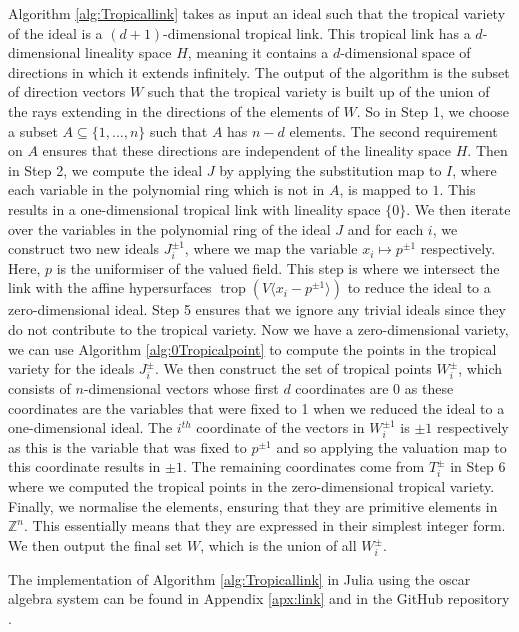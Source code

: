 \documentclass[11pt,reqno,a4paper]{article}
\theoremstyle{theoremstyle}
\theoremstyle{examplestyle}
\theoremstyle{algorithmstyle}
\numberwithin{equation}{subsection}
\newcommand{\ZZ}{\mathbb{Z}}
\DeclareMathOperator{\trop}{trop}
\begin{document}
Algorithm \ref{alg:Tropicallink} takes as input an ideal such that the tropical variety of the ideal is a $(d+1)$-dimensional tropical link. This tropical link has a $d$-dimensional lineality space $H$, meaning it contains a $d$-dimensional space of directions in which it extends infinitely. The output of the algorithm is the subset of direction vectors $W$ such that the tropical variety is built up of the union of the rays extending in the directions of the elements of $W$. So in Step 1, we choose a subset $A \subseteq \{1,\ldots,n\}$ such that $A$ has $n-d$ elements. The second requirement on $A$ ensures that these directions are independent of the lineality space $H$. Then in Step 2, we compute the ideal $J$ by applying the substitution map to $I$, where each variable in the polynomial ring which is not in $A$, is mapped to $1$. This results in a one-dimensional tropical link with lineality space $\{0\}$. We then iterate over the variables in the polynomial ring of the ideal $J$ and for each $i$, we construct two new ideals $J_i^{\pm1}$, where we map the variable $x_i \mapsto p^{\pm1}$ respectively. Here, $p$ is the uniformiser of the valued field. This step is where we intersect the link with the affine hypersurfaces $\trop\left(V\langle x_i - p^{\pm1}\rangle \right)$ to reduce the ideal to a zero-dimensional ideal. Step 5 ensures that we ignore any trivial ideals since they do not contribute to the tropical variety. Now we have a zero-dimensional variety, we can use Algorithm \ref{alg:0Tropicalpoint} to compute the points in the tropical variety for the ideals $J_i^\pm$. We then construct the set of tropical points $W_i^\pm$, which consists of $n$-dimensional vectors whose first $d$ coordinates are $0$ as these coordinates are the variables that were fixed to 1 when we reduced the ideal to a one-dimensional ideal. The $i^{th}$ coordinate of the vectors in $W_i^{\pm1}$ is $\pm1$ respectively as this is the variable that was fixed to $p^{\pm1}$ and so applying the valuation map to this coordinate results in $\pm1$. The remaining coordinates come from $T_i^\pm$ in Step 6 where we computed the tropical points in the zero-dimensional tropical variety. Finally, we normalise the elements, ensuring that they are primitive elements in $\ZZ^n$. This essentially means that they are expressed in their simplest integer form. We then output the final set $W$, which is the union of all $W_i^\pm$.

The implementation of Algorithm \ref{alg:Tropicallink} in Julia using the {\sc oscar} algebra system can be found in Appendix \ref{apx:link} and in the GitHub repository \cite{LinksGitHub}.
\end{document}
